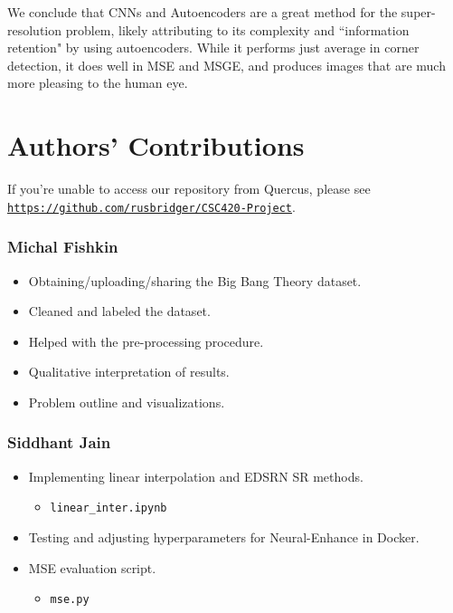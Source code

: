 \documentclass[letterpaper,12pt]{article}
\begin{document}
We conclude that CNNs and Autoencoders are a great method for the super-resolution problem, likely attributing to its complexity and ``information retention" by using autoencoders. While it performs just average in corner detection, it does well in MSE and MSGE, and produces images that are much more pleasing to the human eye.

\pagebreak
\section*{Authors’ Contributions}

If you're unable to access our repository from Quercus, please see \\ \href{https://github.com/rusbridger/CSC420-Project}{\texttt{https://github.com/rusbridger/CSC420-Project}}.

\subsubsection*{Michal Fishkin}
\begin{itemize}
    \item Obtaining/uploading/sharing the Big Bang Theory dataset.
    \item Cleaned and labeled the dataset.
    \item Helped with the pre-processing procedure.
    \item Qualitative interpretation of results.
    \item Problem outline and visualizations. 
\end{itemize}

\subsubsection*{Siddhant Jain}

\begin{itemize}
    \item Implementing linear interpolation and EDSRN SR methods. \begin{itemize}
        \item \texttt{linear\_inter.ipynb}
    \end{itemize}
    \item Testing and adjusting hyperparameters for Neural-Enhance in Docker.
    \item MSE evaluation script. \begin{itemize}
        \item \texttt{mse.py}
    \end{itemize}
\end{itemize}
\end{document}
